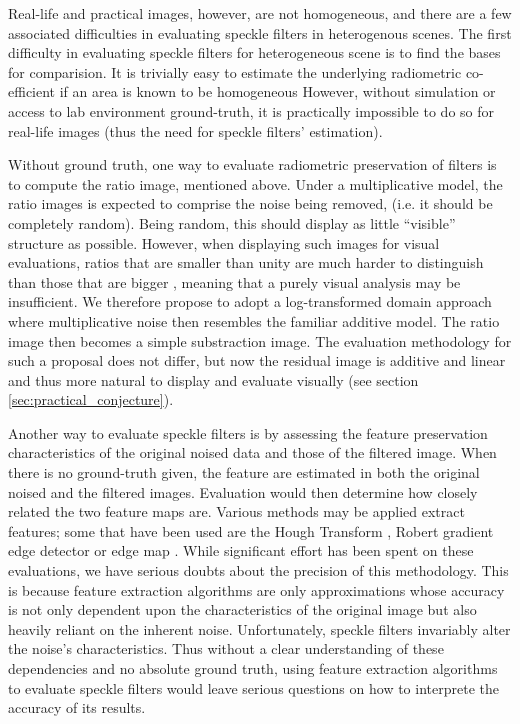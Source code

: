 \documentclass[journal]{IEEEtran}
\begin{document}
Real-life and practical images, however, are not homogeneous, 
	and there are a few associated difficulties in evaluating speckle filters in heterogenous scenes.
The first difficulty in evaluating speckle filters for heterogeneous scene is to find the bases for comparision. 
It is trivially easy to estimate the underlying radiometric co-efficient if an area is known to be homogeneous
However, without simulation or access to lab environment ground-truth, it is practically impossible to do so for real-life images (thus the need for speckle filters' estimation).

Without ground truth, one way to evaluate radiometric preservation of filters is to compute the ratio image, mentioned above. 
Under a multiplicative model, the ratio images is expected to comprise the noise being removed, (i.e. it should be completely random). 
Being random, this should display as little ``visible'' structure as possible. 
However, when displaying such images for visual evaluations, ratios that are smaller than unity are much harder to distinguish than those that are bigger \cite{Medeiros_2003_IJRS}, meaning that a purely visual analysis may be insufficient.
We therefore propose to adopt a log-transformed domain approach where multiplicative noise then resembles the familiar additive model.
The ratio image then becomes a simple substraction image.
The evaluation methodology for such a proposal does not differ, but now the residual image is additive and linear and thus more natural to display and evaluate visually (see section \ref{sec:practical_conjecture}).

Another way to evaluate speckle filters is by assessing the feature preservation characteristics of the original noised data and those of the filtered image. 
When there is no ground-truth given, the feature are estimated in both the original noised and the filtered images.
Evaluation would then determine how closely related the two feature maps are. 
Various methods may be applied extract features; some that have been used are the Hough Transform \cite{Medeiros_2003_IJRS}, Robert gradient edge detector \cite{Gagnon_SPIEProc_1997} or edge map \cite{Frost_PAMI_1982}.
While significant effort has been spent on these evaluations, we have serious doubts about the precision of this methodology.
This is because feature extraction algorithms are only approximations 
	whose accuracy is 
		not only dependent upon the characteristics of the original image 
		but also heavily reliant on the inherent noise.
Unfortunately, speckle filters invariably alter the noise's characteristics.
Thus without a clear understanding of these dependencies and no absolute ground truth, 
	using feature extraction algorithms to evaluate speckle filters would leave serious questions on how to interprete the accuracy of its results.
\end{document}
